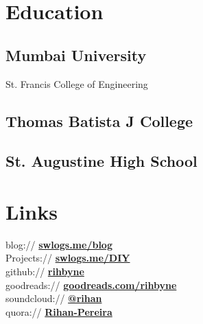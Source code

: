 \documentclass[]{deedy-resume-openfont}
\begin{document}
%
%

%
%



%
%

\begin{minipage}[t]{0.33\textwidth}


\section{Education}

\subsection{Mumbai University}
St. Francis College of Engineering
\sectionsep

\subsection{Thomas Batista J College}
\sectionsep

\subsection{St. Augustine High School}
\sectionsep


\section{Links}
blog:// \href{http://swlogs.me/blog}{\bf swlogs.me/blog} \\
Projects:// \href{http://swlogs.me/DIY}{\bf swlogs.me/DIY} \\
github:// \href{https://github.com/rihbyne}{\bf rihbyne} \\
goodreads://  \href{https://goodreads.com/rihbyne}{\bf goodreads.com/rihbyne} \\ 
soundcloud:// \href{http://www.soundcloud.com/rihbyne}{\bf @rihan} \\
quora://  \href{https://www.quora.com/Rihan-Pereira}{\bf Rihan-Pereira}


\end{minipage}
\end{document}
